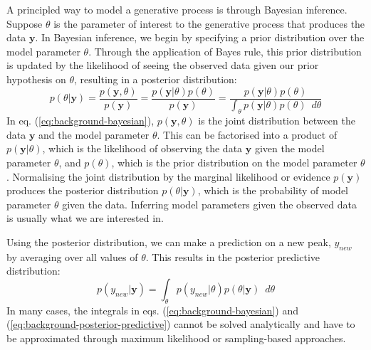 A principled way to model a generative process is through Bayesian inference. Suppose $\theta$ is the parameter of interest to the generative process that produces the data $\mathbf{y}$. In Bayesian inference, we begin by specifying a prior distribution over the model parameter $\theta$. Through the application of Bayes rule, this prior distribution is updated by the likelihood of seeing the observed data given our prior hypothesis on $\theta$, resulting in a posterior distribution:
\begin{equation}
p(\theta \vert \mathbf{y})=\frac{p(\mathbf{y},\theta)}{p(\mathbf{y})}=\frac{p(\mathbf{y} \vert \theta)p(\theta)}{p(\mathbf{y})}=\frac{p(\mathbf{y} \vert \theta)p(\theta)}{\int_{\theta} p(\mathbf{y} \vert \theta)p(\theta) \enspace d\theta}
\label{eq:background-bayesian}
\end{equation}
In eq. (\ref{eq:background-bayesian}), $p(\mathbf{y},\theta)$ is the joint distribution between the data $\mathbf{y}$ and the model parameter $\theta$. This can be factorised into a product of $p(\mathbf{y} \vert \theta)$, which is the likelihood of observing the data $\mathbf{y}$ given the model parameter $\theta$, and $p(\theta)$, which is the prior distribution on the model parameter $\theta$. Normalising the joint distribution by the marginal likelihood or evidence $p(\mathbf{y})$ produces the posterior distribution $p(\theta \vert \mathbf{y})$, which is the probability of model parameter $\theta$ given the data. Inferring model parameters given the observed data is usually what we are interested in.

Using the posterior distribution, we can make a prediction on a new peak, $y_{new}$ by averaging over all values of $\theta$. This results in the posterior predictive distribution:
\begin{equation}
p(y_{new} \vert \mathbf{y})=\int_{\theta} p(y_{new} \vert \theta) p(\theta \vert \mathbf{y}) \enspace d\theta
\label{eq:background-posterior-predictive}
\end{equation}
In many cases, the integrals in eqs. (\ref{eq:background-bayesian}) and (\ref{eq:background-posterior-predictive}) cannot be solved analytically and have to be approximated through maximum likelihood or sampling-based approaches.

